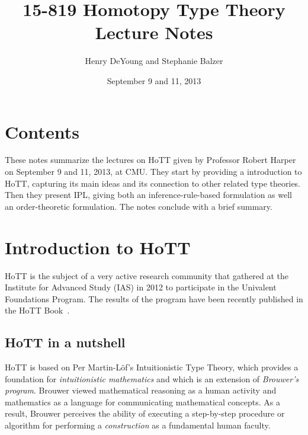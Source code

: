 \documentclass[12pt]{article}
\begin{document}
\title{15-819 Homotopy Type Theory\\ Lecture Notes}
\author{Henry DeYoung and Stephanie Balzer}
\date{September 9 and 11, 2013}

\maketitle





\section{Contents}\label{sec:contents}

These notes summarize the lectures on \ac{HoTT} given by Professor Robert
Harper on September 9 and 11, 2013, at CMU.  They start by providing a introduction to \ac{HoTT},
capturing its main ideas and its connection to other related type theories.  Then they present
\ac{IPL}, giving both an inference-rule-based formulation as
well an order-theoretic formulation.  The notes conclude with a brief summary.


\section{Introduction to \acl{HoTT}}\label{sec:intro}

\Ac{HoTT} is the subject of a very active research community that gathered at the Institute
for Advanced Study (IAS) in 2012 to participate in the Univalent Foundations Program.  The
results of the program have been recently published in the \ac{HoTT} Book~\cite{HoTTBook2013}.

\subsection{\Acs{HoTT} in a nutshell}\label{subsec:hott_in_nutshell}

\Ac{HoTT} is based on Per Martin-L\"{o}f's Intuitionistic Type Theory, which provides a
foundation for \emph{intuitionistic mathematics} and which is an extension of \emph{Brouwer's
  program}.  Brouwer viewed mathematical reasoning as a human activity and mathematics as a
language for communicating mathematical concepts.  As a result, Brouwer perceives the ability
of executing a step-by-step procedure or algorithm for performing a \emph{construction} as a
fundamental human faculty.
\end{document}

